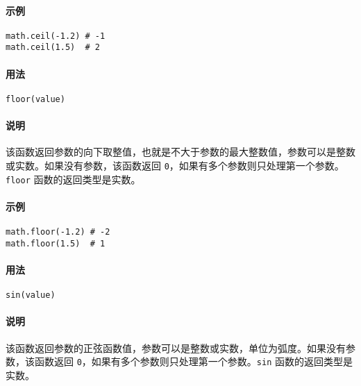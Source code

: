 \paragraph{示例}
\begin{lstlisting}[language=berry, numbers=none]
math.ceil(-1.2) # -1
math.ceil(1.5)  # 2
\end{lstlisting}


\paragraph{用法}
\begin{lstlisting}[language=berry, numbers=none]
floor(value)
\end{lstlisting}

\paragraph{说明}
该函数返回参数的向下取整值，也就是不大于参数的最大整数值，参数可以是整数或实数。如果没有参数，该函数返回 \texttt{0}，如果有多个参数则只处理第一个参数。\texttt{floor} 函数的返回类型是实数。

\paragraph{示例}
\begin{lstlisting}[language=berry, numbers=none]
math.floor(-1.2) # -2
math.floor(1.5)  # 1
\end{lstlisting}


\paragraph{用法}
\begin{lstlisting}[language=berry, numbers=none]
sin(value)
\end{lstlisting}

\paragraph{说明}
该函数返回参数的正弦函数值，参数可以是整数或实数，单位为弧度。如果没有参数，该函数返回 \texttt{0}，如果有多个参数则只处理第一个参数。\texttt{sin} 函数的返回类型是实数。

